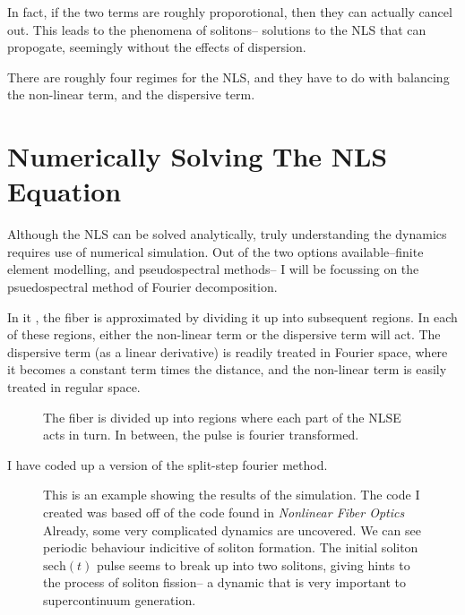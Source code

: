 \documentclass[12pt, titlepage]{article}
\begin{document}
\begin{spacing}{1.1}
In fact, if the two terms are roughly proporotional, then they can
actually cancel out. This leads to the phenomena of solitons-- solutions to the NLS that can propogate, seemingly without the effects of dispersion. 

There are roughly four regimes for the NLS, and they have to do with balancing the non-linear term, and the dispersive term.
\begin{comment}
ToDo:
I still need to flush out this section more.
Figures: I want two figures-- one that shows the action of each term in the nsl
also see the thesis, there is some helpful exposition in there.
\end{comment}
\section{Numerically Solving The NLS Equation}
Although the NLS can be solved analytically, truly understanding the dynamics requires use of numerical simulation. Out of the two options available--finite element modelling, and pseudospectral methods-- I will be focussing on the psuedospectral method of Fourier decomposition.

In it , the fiber is approximated by dividing it up into subsequent regions. In each of these regions, either the non-linear term or the dispersive term will act. The dispersive term (as a linear derivative) is readily treated in Fourier space, where it becomes a constant term times the distance, and the non-linear term is easily treated in regular space.
\begin{figure}[h!]
 \centering
                    \caption{The fiber is divided up into regions where each part of the NLSE acts in turn. In between, the pulse is fourier transformed.}
                    
                              \label{fig:fiber}
                              \end{figure}




I have coded up a version of the split-step fourier method.


\begin{figure}[h!]
 \centering
                    \caption{This is an example showing the results of the simulation. The code I created was based off of the code found in \textit{Nonlinear Fiber Optics}\cite{gorovind}
                    Already, some very complicated dynamics are uncovered.
                    We can see periodic behaviour indicitive of soliton formation.
                    The initial soliton $\text{sech}(t)$ pulse seems to break up into two solitons, giving hints to the process of soliton fission-- a dynamic that is very important to supercontinuum generation.}
                    

\end{figure}
\end{spacing}
\end{document}
